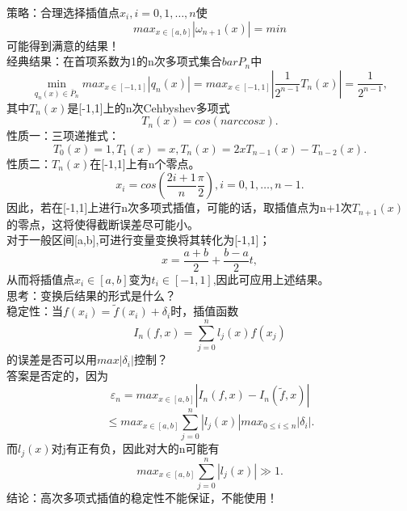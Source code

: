 \documentclass[a4paper,12pt]{article}
\begin{document}
\begin{CJK*}{UTF8}{gbsn}
	策略：合理选择插值点$x_i,i=0,1,\ldots,n$使
	$$ max_{x\in[a,b]}|\omega_{n+1}(x)|=min $$
	可能得到满意的结果！\\
	经典结果：在首项系数为1的n次多项式集合$bar{P}_n$中
	$$\min_{q_n(x)\in\bar{P}_n}max_{x\in[-1,1]}|q_n(x)| = max_{x\in[-1,1]}|\frac{1}{2^{n-1}}T_n(x)|=\frac{1}{2^{n-1}},$$
	其中$T_n(x)$是[-1,1]上的n次Cehbyshev多项式
	$$T_n(x)=cos(narccosx).$$
	性质一：三项递推式：
	$$T_0(x) = 1,T_1(x)=x,T_n(x)=2xT_{n-1}(x)-T_{n-2}(x).$$
	性质二：$T_n(x)$在[-1,1]上有n个零点。
	$$x_i=cos(\frac{2i+1}{n}\frac{\pi}{2}),i=0,1,\ldots,n-1.$$
	因此，若在[-1,1]上进行n次多项式插值，可能的话，取插值点为n+1次$T_{n+1}(x)$的零点，这将使得截断误差尽可能小。\\
	对于一般区间[a,b],可进行变量变换将其转化为[-1,1]；
	$$x=\frac{a+b}{2}+\frac{b-a}{2}t,$$
	从而将插值点$x_i\in[a,b]$变为$t_i\in[-1,1]$,因此可应用上述结果。\\
	思考：变换后结果的形式是什么？\\
	稳定性：当$f(x_i)=\tilde{f}(x_i)+\delta_i$时，插值函数
	$$I_n(f,x)=\sum\limits_{j=0}^{n}l_j(x)f(x_j)$$
	的误差是否可以用$max|\delta_i|$控制？\\
	答案是否定的，因为
	$$\varepsilon_n = max_{x\in[a,b]}|I_n(f,x)-I_n(\tilde{f},x)| $$
	$$\le max_{x\in[a,b]}\sum_{j=0}^{n}|l_j(x)|max_{0\le i\le n}|\delta_i|.$$
	而$l_j(x)$对j有正有负，因此对大的n可能有$$max_{x\in[a,b]}\sum\limits_{j=0}^n|l_j(x)|\gg 1.$$
	结论：高次多项式插值的稳定性不能保证，不能使用！

\end{CJK*}
\end{document}
